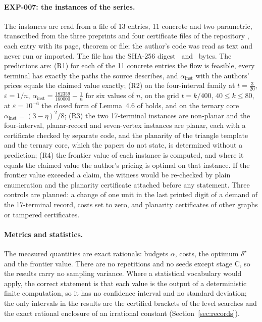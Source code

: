 \documentclass[11pt]{article}
\theoremstyle{remark}
\newcommand{\EXP}[1]{\mbox{EXP-#1}}
\begin{document}
\paragraph{\EXP{007}: the instances of the series.} The instances are read from a file of 13 entries, 11 concrete and two parametric, transcribed from the three preprints \cite{Nik1,Nik2,Nik3} and four certificate files of the repository \cite{NikRepo}, each entry with its page, theorem or file; the author's code was read as text and
never run or imported. The file has the SHA-256 digest \ninstdigest\ and \ninstbytes\ bytes. The predictions are: (R1) for each of the 11 concrete entries the flow is feasible, every terminal has exactly the paths the source describes, and $\alpha_{\mathrm{inst}}$ with the authors' prices equals the claimed value exactly;
(R2) on the four-interval family at $t=\tfrac3{20}$, $\varepsilon=1/n$, $\alpha_{\mathrm{inst}}=\tfrac{182359}{160000}-\tfrac1n$ for six values of $n$, on the grid $t=k/400$, $40\le k\le80$, at $\varepsilon=10^{-6}$ the closed form of Lemma~4.6 of \cite{Nik1} holds, and on the ternary core
$\alpha_{\mathrm{inst}}=(3-\eta)^2/8$; (R3) the two 17-terminal instances are non-planar and the four-interval, planar-record and seven-vertex instances are planar, each with a certificate checked by separate code, and the planarity of the triangle template and the ternary core, which the papers do not state, is determined without
a prediction; (R4) the frontier value of each instance is computed, and where it equals the claimed value the author's pricing is optimal on that instance. If the frontier value exceeded a claim, the witness would be re-checked by plain enumeration and the planarity certificate attached before any statement.
Three controls are planned: a change of one unit in the last printed digit of a demand of the 17-terminal record, costs set to zero, and planarity certificates of other graphs or tampered certificates.

\paragraph{Metrics and statistics.} The measured quantities are exact rationals: budgets $\alpha$, costs, the optimum $\delta^\star$ and the frontier value. There are no repetitions and no seeds except stage C, so the results carry no sampling
variance. Where a statistical vocabulary would apply, the correct statement is that each value is the output of a deterministic finite computation, so it has no confidence interval and no standard deviation; the only intervals in the results are the certified brackets of the level searches and the exact
rational enclosure of an irrational constant (Section~\ref{sec:records}).
\end{document}
